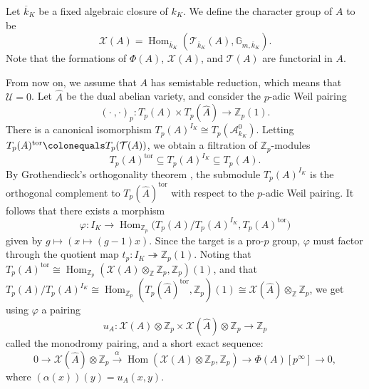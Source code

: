 \documentclass[a4paper, notitlepage, 10pt]{amsart}
\theoremstyle{plain} %
\theoremstyle{definition} %
\theoremstyle{remark} %
\numberwithin{equation}{section}
\newcommand{\bbZ}{\mathbb Z}
\newcommand{\Hom}{\operatorname{Hom}} %
\begin{document}
Let $\overline{k}_K$ be a fixed algebraic closure of $k_K$. We define the character group of $A$ to be
\begin{equation*}
    \mathcal{X}(A)=\Hom_{\overline{k}_K}(\mathcal{T}_{\overline{k}_K}(A),\mathbb{G}_{m,\overline{k}_K}).
\end{equation*}
Note that the formations of $\Phi(A)$, $\mathcal{X}(A)$, and $\mathcal{T}(A)$ are functorial in $A$. 

From now on, we assume that $A$ has semistable reduction, which means that $\mathcal{U}=0$. Let $\hat{A}$ be the dual abelian variety, and consider the $p$-adic Weil pairing
\begin{equation*}
    (\cdot \  ,\cdot)_p\colon T_p(A)\times T_p(\hat{A})\rightarrow \bbZ_p(1).
\end{equation*}
There is a canonical isomorphism $T_p(A)^{I_{K}}\cong T_p(\mathcal{A}_{k_K}^0)$. Letting $T_p(A)^{\text{tor}}\colonequals T_p(\mathcal{T}(A))$, we obtain a filtration of $\bbZ_p$-modules
\begin{equation*}
    T_p(A)^{\text{tor}}\subseteq T_p(A)^{I_{K}}\subseteq T_p(A).
\end{equation*}
By Grothendieck's orthogonality theorem \cite[ Exposé IX, \S 9.2]{SGA7I}, the submodule $T_p(A)^{I_{K}}$ is the orthogonal complement to $T_p(\hat{A})^{\text{tor}}$ with respect to the $p$-adic Weil pairing. It follows that there exists a morphism
$$ \varphi\colon I_{K} \longrightarrow \Hom_{\bbZ_p}\big(T_p(A)/T_p(A)^{I_{K}},T_p(A)^{\text{tor}}\big) $$
given by $g\mapsto (x\mapsto (g-1)x)$. Since the target is a pro-$p$ group, $\varphi$ must factor through the quotient map $t_p\colon I_{K}\twoheadrightarrow \bbZ_p(1)$.
Noting that $T_p(A)^{\text{tor}}\cong \Hom_{\bbZ_p}(\mathcal{X}(A)\otimes_\bbZ \bbZ_p,\bbZ_p)(1)$, and that $T_p(A)/T_p(A)^{I_{K}}\cong \Hom_{\bbZ_p}(T_p(\hat{A})^{\text{tor}},\bbZ_p)(1)\cong \mathcal{X}(\hat{A})\otimes_\bbZ\bbZ_p$, we get using $\varphi$ a pairing 
\begin{equation}\label{monodromypairing}
    u_{A}\colon \mathcal{X}(A)\otimes\bbZ_p\times \mathcal{X}(\hat{A})\otimes \bbZ_p\rightarrow \bbZ_p
\end{equation}
called the monodromy pairing, and a short exact sequence:
\begin{equation*}
    0 \rightarrow \mathcal{X}(\hat{A})\otimes \bbZ_p \xrightarrow{\alpha} \Hom(\mathcal{X}(A)\otimes \bbZ_p,\bbZ_p)\rightarrow \Phi(A)[p^\infty]\rightarrow 0,
\end{equation*}
where $(\alpha(x))(y)=u_{A}(x,y)$.
\end{document}
